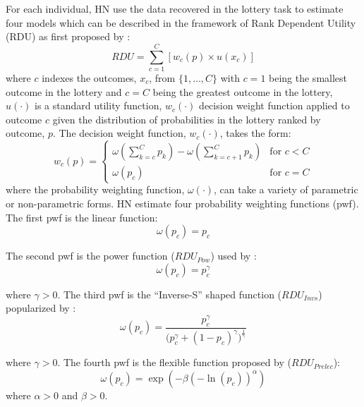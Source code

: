 \documentclass[../main.tex]{subfiles}
\begin{document}
For each individual, HN use the data recovered in the lottery task to estimate four models which can be described in the framework of Rank Dependent Utility (RDU) as first proposed by \textcite{Quiggin1982}:
\begin{equation}
	\label{eq4:RDU}
	RDU = \sum_{c=1}^{C} \left[ w_c(p) \times u(x_c) \right]
\end{equation}
\noindent where $c$ indexes the outcomes, $x_c$, from $\{1,\ldots,C\}$ with $c=1$ being the smallest outcome in the lottery and $c=C$ being the greatest outcome in the lottery, $u(\cdot)$ is a standard utility function, $w_c(\cdot)$ decision weight function applied to outcome $c$ given the distribution of probabilities in the lottery ranked by outcome, $p$.
The decision weight function, $w_c(\cdot)$, takes the form:
\begin{equation}
	\label{eq4:dweight}
	w_c(p) =
	\begin{cases}
		\omega\left(\displaystyle\sum_{k=c}^C p_k\right) - \omega\left(\displaystyle\sum_{k=c+1}^C p_k\right) & \text{for } c<C \\
		\omega(p_c) & \text{for } c = C
	\end{cases}
\end{equation}
\noindent where the probability weighting function, $\omega(\cdot)$, can take a variety of parametric or non-parametric forms.
HN estimate four probability weighting functions (pwf).
The first pwf is the linear function:
\begin{equation}
	\label{eq4:pw:eut}
	\omega(p_c) = p_c
\end{equation}

\noindent The second pwf is the power function ($\mathit{RDU_{Pow}}$) used by \textcite{Quiggin1982}:
\begin{equation}
	\label{eq4:pw:pow}
	\omega(p_c)=p_c^\gamma
\end{equation}

\noindent where $\gamma > 0$. 
The third pwf is the \enquote{Inverse-S} shaped function ($\mathit{RDU_{Invs}}$) popularized by \textcite{Tversky1992}:
\begin{equation}
	\label{eq4:pw:inv}
	\omega(p_c) = \frac{p_c^\gamma}{\biggl(p_c^\gamma + {(1-p_c)}^\gamma\biggr)^{ \frac{1}{\gamma} } }
\end{equation}

\noindent where $\gamma > 0$. 
The fourth pwf is the flexible function proposed by \textcite{Prelec1998} ($\mathit{RDU_{Prelec}}$):
\begin{equation}
	\label{eq4:pw:pre}
	\omega(p_c)=\exp(-\beta(-\ln(p_c))^\alpha)
\end{equation}
\noindent where $\alpha > 0$ and $\beta > 0$.
\end{document}
